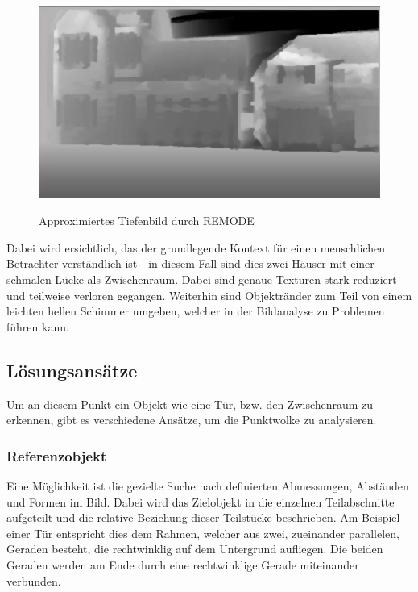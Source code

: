 \begin{figure}[ht]
	\centering
	\includegraphics[scale=0.5]{Bilder/REMODE.jpg}
	\label{fig:REMODE}
	\caption{Approximiertes Tiefenbild durch REMODE}
\end{figure}

Dabei wird ersichtlich, das der grundlegende Kontext für einen menschlichen Betrachter verständlich ist - in diesem Fall sind dies zwei Häuser mit einer schmalen Lücke als Zwischenraum. Dabei sind genaue Texturen stark reduziert und teilweise verloren gegangen. Weiterhin sind Objektränder zum Teil von einem leichten hellen Schimmer umgeben, welcher in der Bildanalyse zu Problemen führen kann.


\subsection{Lösungsansätze}
Um an diesem Punkt ein Objekt wie eine Tür, bzw. den Zwischenraum zu erkennen, gibt es verschiedene Ansätze, um die Punktwolke zu analysieren.

\subsubsection{Referenzobjekt}
Eine Möglichkeit ist die gezielte Suche nach definierten Abmessungen, Abständen und Formen im Bild. Dabei wird das Zielobjekt in die einzelnen Teilabschnitte aufgeteilt und die relative Beziehung dieser Teilstücke beschrieben. Am Beispiel einer Tür entspricht dies dem Rahmen, welcher aus zwei, zueinander parallelen, Geraden besteht, die rechtwinklig auf dem Untergrund aufliegen. Die beiden Geraden werden am Ende durch eine rechtwinklige Gerade miteinander verbunden. \newline

